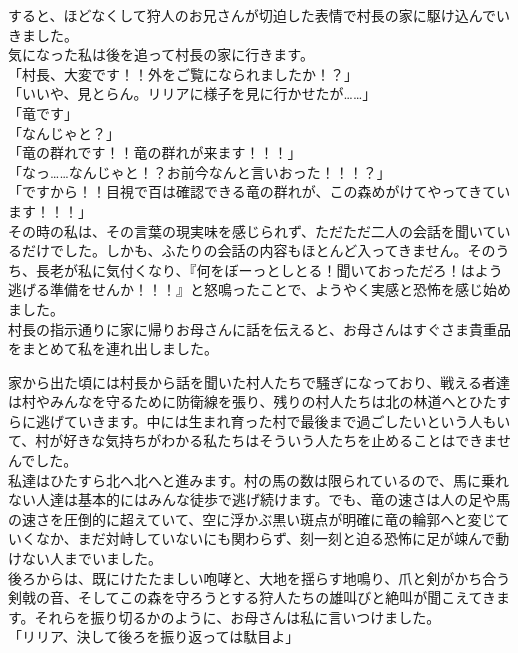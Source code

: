 \documentclass[oneside, a4paper]{jsbook}
\begin{document}
すると、ほどなくして狩人のお兄さんが切迫した表情で村長の家に駆け込んでいきました。\\
気になった私は後を追って村長の家に行きます。\\

\noindent
「村長、大変です！！外をご覧になられましたか！？」\\
「いいや、見とらん。リリアに様子を見に行かせたが……」\\
「竜です」\\
「なんじゃと？」\\
「竜の群れです！！竜の群れが来ます！！！」\\
「なっ……なんじゃと！？お前今なんと言いおった！！！？」\\
「ですから！！目視で百は確認できる竜の群れが、この森めがけてやってきています！！！」\\

その時の私は、その言葉の現実味を感じられず、ただただ二人の会話を聞いているだけでした。しかも、ふたりの会話の内容もほとんど入ってきません。そのうち、長老が私に気付くなり、『何をぼーっとしとる！聞いておっただろ！はよう逃げる準備をせんか！！！』と怒鳴ったことで、ようやく実感と恐怖を感じ始めました。\\

村長の指示通りに家に帰りお母さんに話を伝えると、お母さんはすぐさま貴重品をまとめて私を連れ出しました。

家から出た頃には村長から話を聞いた村人たちで騒ぎになっており、戦える者達は村やみんなを守るために防衛線を張り、残りの村人たちは北の林道へとひたすらに逃げていきます。中には生まれ育った村で最後まで過ごしたいという人もいて、村が好きな気持ちがわかる私たちはそういう人たちを止めることはできませんでした。\\

私達はひたすら北へ北へと進みます。村の馬の数は限られているので、馬に乗れない人達は基本的にはみんな徒歩で逃げ続けます。でも、竜の速さは人の足や馬の速さを圧倒的に超えていて、空に浮かぶ黒い斑点が明確に竜の輪郭へと変じていくなか、まだ対峙していないにも関わらず、刻一刻と迫る恐怖に足が竦んで動けない人までいました。\\

後ろからは、既にけたたましい咆哮と、大地を揺らす地鳴り、爪と剣がかち合う剣戟の音、そしてこの森を守ろうとする狩人たちの雄叫びと絶叫が聞こえてきます。それらを振り切るかのように、お母さんは私に言いつけました。\\

\noindent
「リリア、決して後ろを振り返っては駄目よ」\\
\end{document}
